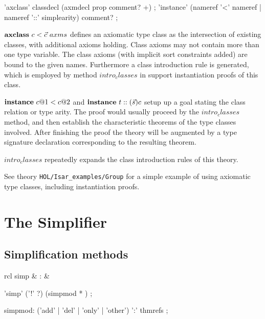 \begin{rail}
  'axclass' classdecl (axmdecl prop comment? +)
  ;
  'instance' (nameref '<' nameref | nameref '::' simplearity) comment?
  ;
\end{rail}

\begin{descr}
\item [${\mathord{\mathbf{axclass}}}~c < \vec c~axms$] defines an axiomatic type
  class as the intersection of existing classes, with additional axioms
  holding.  Class axioms may not contain more than one type variable.  The
  class axioms (with implicit sort constraints added) are bound to the given
  names.  Furthermore a class introduction rule is generated, which is
  employed by method $intro_classes$ in support instantiation proofs of this
  class.
  
\item [${\mathord{\mathbf{instance}}}~c@1 < c@2$ and ${\mathord{\mathbf{instance}}}~t ::
  (\vec s)c$] setup up a goal stating the class relation or type arity.  The
  proof would usually proceed by the $intro_classes$ method, and then
  establish the characteristic theorems of the type classes involved.  After
  finishing the proof the theory will be augmented by a type signature
  declaration corresponding to the resulting theorem.
\item [$intro_classes$] repeatedly expands the class introduction rules of
  this theory.
\end{descr}

See theory \texttt{HOL/Isar_examples/Group} for a simple example of using
axiomatic type classes, including instantiation proofs.


\section{The Simplifier}

\subsection{Simplification methods}\label{sec:simp}

\begin{matharray}{rcl}
  simp & : & \isarmeth \\
\end{matharray}

\begin{rail}
  'simp' ('!' ?) (simpmod * )
  ;

  simpmod: ('add' | 'del' | 'only' | 'other') ':' thmrefs
  ;
\end{rail}

